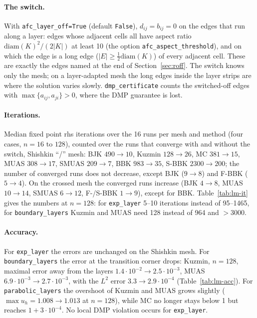 \documentclass[11pt]{article}
\begin{document}
\paragraph{The switch.} With \texttt{afc\_layer\_off=True} (default \texttt{False}), $d_{ij}=b_{ij}=0$ on the edges
that run along a layer: edges whose adjacent cells all have aspect ratio
$\mathrm{diam}(K)^2/(2|K|)$ at least 10 (the option \texttt{afc\_aspect\_threshold}), and on which the edge is a long edge
($|E|\ge\frac12\mathrm{diam}(K)$) of every adjacent cell. These are exactly the edges named at the end of
Section~\ref{sec:roff}. The switch knows only the mesh; on a layer-adapted mesh the long edges inside the layer strips
are where the solution varies slowly. \texttt{dmp\_certificate} counts the switched-off edges with
$\max\{a_{ij},a_{ji}\}>0$, where the DMP guarantee is lost.

\paragraph{Iterations.} Median fixed point rhs iterations over the 16 runs per mesh and method (four cases, $n=16$ to
$128$), counted over the runs that converge with and without the switch, Shishkin ``/'' mesh: BJK $490\to10$, Kuzmin
$128\to26$, MC $381\to15$, MUAS $308\to17$, SMUAS $209\to7$, BBK $983\to35$, S-BBK $2300\to200$; the number of
converged runs does not decrease, except BJK ($9\to8$) and F-BBK ($5\to4$). On the crossed mesh the converged runs
increase (BJK $4\to8$, MUAS $10\to14$, SMUAS $6\to12$, F-/S-BBK $1\to9$), except for BBK. Table~\ref{tab:lm-it} gives
the numbers at $n=128$: for \texttt{exp\_layer} 5--10 iterations instead of 95--1465, for \texttt{boundary\_layers}
Kuzmin and MUAS need 128 instead of 964 and $>3000$.

\paragraph{Accuracy.} For \texttt{exp\_layer} the errors are unchanged on the Shishkin mesh. For
\texttt{boundary\_layers} the error at the transition corner drops: Kuzmin, $n=128$, maximal error away from the layers
$1.4\cdot10^{-2}\to2.5\cdot10^{-3}$, MUAS $6.9\cdot10^{-3}\to2.7\cdot10^{-3}$, with the $L^2$ error $3.3\to2.9\cdot10^{-4}$
(Table~\ref{tab:lm-acc}). For \texttt{parabolic\_layers} the overshoot of Kuzmin and MUAS grows slightly
($\max u_h=1.008\to1.013$ at $n=128$), while MC no longer stays below 1 but reaches $1+3\cdot10^{-4}$. No local DMP
violation occurs for \texttt{exp\_layer}.
\end{document}
